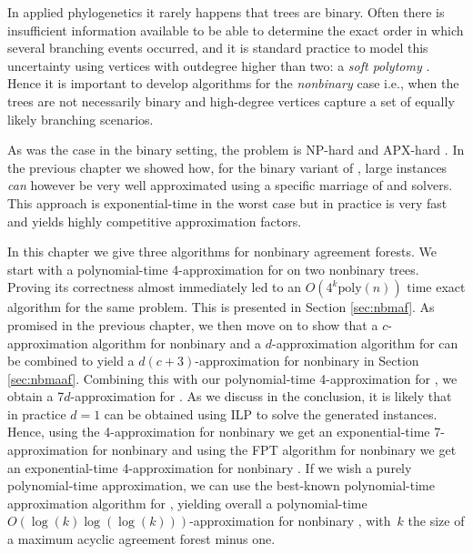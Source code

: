 
In applied phylogenetics it rarely happens that trees are binary. Often there is insufficient information available to be able to determine the exact order in which several branching events occurred, and it is standard practice to model this uncertainty using vertices with outdegree higher than two: a \emph{soft polytomy} \cite{davidbook}. Hence it is important to develop algorithms for the \emph{nonbinary} case i.e., when the trees are not necessarily binary and high-degree vertices capture a set of equally likely branching scenarios. 


As was the case in the binary setting, the problem \maaf is NP-hard and APX-hard \cite{bordewich07a}. In the previous chapter we showed how, for the binary variant of \maaf, large instances \emph{can} however be very well approximated using a specific marriage of \maf and \dfvs solvers. This approach is exponential-time in the worst case but in practice is very fast and yields highly competitive approximation factors. %

In this chapter we give three algorithms for nonbinary agreement forests. We start with a polynomial-time 4-approximation for \maf on two nonbinary trees. Proving its correctness almost immediately led to an $O(4^k \text{poly}(n))$ time exact algorithm for the same problem. This is presented in Section \ref{sec:nbmaf}. As promised in the previous chapter, we then move on to show that a $c$-approximation algorithm for nonbinary \maf and a $d$-approximation algorithm for \dfvs can be combined to yield a $d(c+3)$-approximation for nonbinary \maaf in Section \ref{sec:nbmaaf}. Combining this with our polynomial-time 4-approximation for \maf, we obtain a 7$d$-approximation for \maaf. As we discuss in the conclusion, it is likely that in practice $d=1$ can be obtained using ILP to solve the generated \dfvs instances. Hence, using the 4-approximation for nonbinary \maf we get an exponential-time 7-approximation for nonbinary \maaf and using the FPT algorithm for nonbinary \maf we get an exponential-time 4-approximation for nonbinary \maaf. If we wish a purely polynomial-time approximation, we can use the best-known polynomial-time approximation algorithm for \dfvs, yielding overall a polynomial-time $O(\log(k)\log(\log(k)))$-approximation for nonbinary \maaf, with~$k$ the size of a maximum acyclic agreement forest minus one. 

